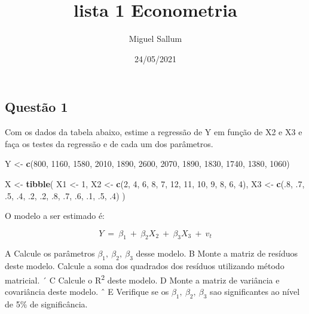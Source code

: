 \documentclass[
]{article}
\title{lista 1 Econometria}
\author{Miguel Sallum}
\date{24/05/2021}
\newenvironment{Shaded}{\begin{snugshade}}{\end{snugshade}}
\newcommand{\DecValTok}[1]{\textcolor[rgb]{0.00,0.00,0.81}{#1}}
\newcommand{\FloatTok}[1]{\textcolor[rgb]{0.00,0.00,0.81}{#1}}
\newcommand{\KeywordTok}[1]{\textcolor[rgb]{0.13,0.29,0.53}{\textbf{#1}}}
\newcommand{\NormalTok}[1]{#1}
\newcommand{\StringTok}[1]{\textcolor[rgb]{0.31,0.60,0.02}{#1}}
\begin{document}
\maketitle

\hypertarget{questuxe3o-1}{%
\subsection{Questão 1}\label{questuxe3o-1}}

Com os dados da tabela abaixo, estime a regressão de Y em função de X2 e
X3 e faça os testes da regressão e de cada um dos parâmetros.

\begin{Shaded}
\begin{Highlighting}[]
\NormalTok{Y <-}\StringTok{ }\KeywordTok{c}\NormalTok{(}\DecValTok{800}\NormalTok{, }\DecValTok{1160}\NormalTok{, }\DecValTok{1580}\NormalTok{, }\DecValTok{2010}\NormalTok{, }\DecValTok{1890}\NormalTok{, }\DecValTok{2600}\NormalTok{, }\DecValTok{2070}\NormalTok{, }\DecValTok{1890}\NormalTok{, }\DecValTok{1830}\NormalTok{, }\DecValTok{1740}\NormalTok{, }\DecValTok{1380}\NormalTok{, }\DecValTok{1060}\NormalTok{)}

\NormalTok{X <-}\StringTok{ }\KeywordTok{tibble}\NormalTok{(}
\NormalTok{  X1 <-}\StringTok{ }\DecValTok{1}\NormalTok{,}
\NormalTok{  X2 <-}\StringTok{ }\KeywordTok{c}\NormalTok{(}\DecValTok{2}\NormalTok{, }\DecValTok{4}\NormalTok{, }\DecValTok{6}\NormalTok{, }\DecValTok{8}\NormalTok{, }\DecValTok{7}\NormalTok{, }\DecValTok{12}\NormalTok{, }\DecValTok{11}\NormalTok{, }\DecValTok{10}\NormalTok{, }\DecValTok{9}\NormalTok{, }\DecValTok{8}\NormalTok{, }\DecValTok{6}\NormalTok{, }\DecValTok{4}\NormalTok{),}
\NormalTok{  X3 <-}\StringTok{ }\KeywordTok{c}\NormalTok{(.}\DecValTok{8}\NormalTok{, }\FloatTok{.7}\NormalTok{, }\FloatTok{.5}\NormalTok{, }\FloatTok{.4}\NormalTok{, }\FloatTok{.2}\NormalTok{, }\FloatTok{.2}\NormalTok{, }\FloatTok{.8}\NormalTok{, }\FloatTok{.7}\NormalTok{, }\FloatTok{.6}\NormalTok{, }\FloatTok{.1}\NormalTok{, }\FloatTok{.5}\NormalTok{, }\FloatTok{.4}\NormalTok{)}
\NormalTok{)}
\end{Highlighting}
\end{Shaded}

O modelo a ser estimado é:

\[Y\ =\ \beta_1\ +\ \beta_2X_2\ +\ \beta_3X_3\ +\ v_t\]

A Calcule os parâmetros \(\beta_{1},\ \beta_{2},\ \beta_{3}\) desse
modelo. B Monte a matriz de resíduos deste modelo. Calcule a soma dos
quadrados dos resíduos utilizando método matricial. ´ C Calcule o
R\textsuperscript{2} deste modelo. D Monte a matriz de variância e
covariância deste modelo. ˆ E Verifique se os
\(\beta_{1},\ \beta_{2},\ \beta_{3}\) sao significantes ao nível de 5\%
de significância.
\end{document}

